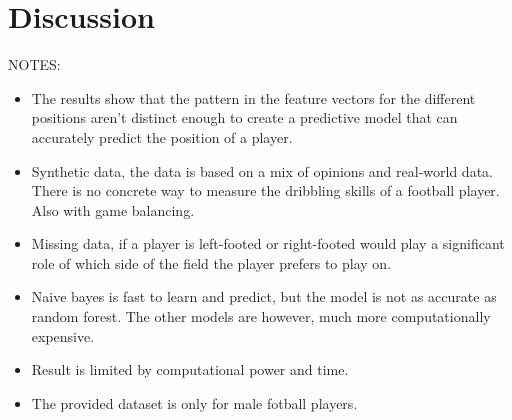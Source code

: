 \section{Discussion}

NOTES:
\begin{itemize}
    \item The results show that the pattern in the feature vectors for the different positions aren't distinct enough to create a predictive model that can accurately predict the position of a player.
    \item Synthetic data, the data is based on a mix of opinions and real-world data. There is no concrete way to measure the dribbling skills of a football player. Also with game balancing.
    \item Missing data, if a player is left-footed or right-footed would play a significant role of which side of the field the player prefers to play on.
    \item Naive bayes is fast to learn and predict, but the model is not as accurate as random forest. The other models are however, much more computationally expensive. 
    \item Result is limited by computational power and time.
    \item The provided dataset is only for male fotball players.

\end{itemize}
